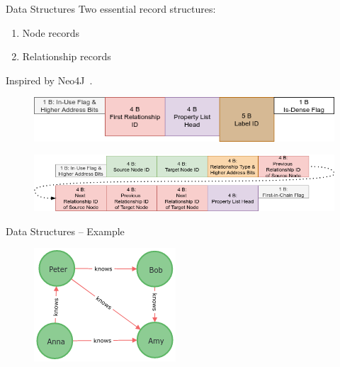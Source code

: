 \documentclass[rgb]{beamer}
\begin{document}
         \begin{frame}[allowframebreaks]{Data Structures}
            Two essential record structures: \\ [2em]
            \begin{enumerate}
                \item Node records \\ [2em]
                \item Relationship records \\ [3em]
            \end{enumerate}
            Inspired by Neo4J~\autocite{robinson2015graph, Rodriguez2010ConstructionsFD}.
            
            \framebreak
            \begin{figure}
                \begin{center}
                \includegraphics[keepaspectratio, height=\textheight, width=\textwidth]{img/node_record.png}
                \end{center}
            \end{figure}
            
            \framebreak
            \begin{figure}
                \begin{center}
                \includegraphics[keepaspectratio, height=\textheight, width=\textwidth]{img/relationship_record.png}
                \end{center}
            \end{figure}
        \end{frame}
        
        \begin{frame}[fragile]{Data Structures -- Example}
            \begin{figure}
                \begin{center}
                \includegraphics[keepaspectratio, height=0.4\textheight, width=.4\textwidth]{img/graph.png}
                \end{center}
            \end{figure}
            \end{frame}
            
\end{document}
